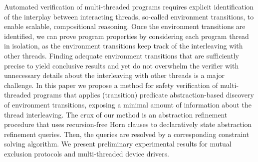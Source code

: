%
Automated verification of multi-threaded programs requires explicit
identification of the interplay between interacting threads, so-called
environment transitions, to enable scalable, compositional reasoning.  
Once the environment transitions are identified, we can prove program
properties by considering each program thread in isolation, as the
environment transitions keep track of the interleaving with other
threads.
Finding adequate environment transitions that are sufficiently precise
to yield conclusive results and yet do not overwhelm the verifier with
unnecessary details about the interleaving with other threads is a
major challenge.
In this paper we propose a method for safety verification of
multi-threaded programs that applies (transition) predicate
abstraction-based discovery of environment transitions, exposing a
minimal amount of information about the thread interleaving.
The crux of our method is an abstraction refinement procedure that
uses recursion-free Horn clauses to declaratively state abstraction
refinement queries.
Then, the queries are resolved by a corresponding constraint solving
algorithm.
We present preliminary experimental results for mutual exclusion
protocols and multi-threaded device drivers.



\iffalse %
%
In order to scale, verification of multi-threaded programs requires
definition of auxiliary variables that reveal some details about the
local state of the concurrent threads and construction of
rely/guarantee assertions that describe the thread interaction in
terms of shared and auxiliary variables.
%
In this paper we present an automatic method for the discovery of
auxiliary variables and relies/guarantees.
Our method is based on a generalization of counterexample guided
abstraction refinement to the multi-threaded setting.
The crux of the generalization is a notion of tree-like
counterexamples that explicitly account for thread interleaving.
By solving the corresponding tree-like path constraints, our method
reveals additional local facts through auxiliary variables and
iteratively strengthens relies/guarantees.
Furthermore, the tree-like path constraints can avoid the introduction
of auxiliary variables when they are not necessary.
We devised a solver for the tree-like constraints that is based on
Craig interpolation and used it in a prototype implementation of our
method.
We present preliminary experimental results for mutual exclusion
protocols and concurrent device drivers.
\fi


